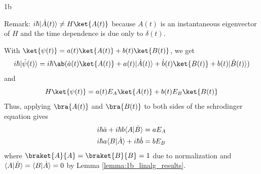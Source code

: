 \documentclass[12pt]{article}
\begin{document}
\begin{exc}{1b}
\end{exc}
\begin{ans}
Remark: $i\hbar \uket{\dot A(t)} \neq H\ket{A(t)}$ because $A(t)$ is an instantaneous eigenvector of $H$ and the time dependence is due only to $\delta(t)$.


With $\ket{\psi(t)} = a(t)\ket{A(t)} + b(t)\ket{B(t)}$, we get
\begin{equation*}
    i\hbar \uket{\dot \psi(t)} = i\hbar\ab(\dot a(t) \ket{A(t)} + a(t) \uket{\dot A(t)} + \dot b(t) \ket{B(t)} + b(t) \uket{\dot B(t)})
\end{equation*}
and 
\begin{equation*}
    H\ket{\psi(t)} = a(t)E_A\ket{A(t)} + b(t) E_B\ket{B(t)}
\end{equation*}
Thus, applying $\bra{A(t)}$ and $\bra{B(t)}$ to both sides of the schrodinger equation gives
\begin{align*}
    i\hbar \dot a  + i \hbar b \langle A \vert \dot B \rangle &= a E_A  \\
    i\hbar a \langle B \vert \dot A \rangle + i \hbar \dot b &= bE_B 
\end{align*}
where $\braket{A}{A} = \braket{B}{B} = 1$ due to normalization and $\langle A \vert \dot B \rangle = \langle B \vert \dot A \rangle = 0$ by Lemma \ref{lemma:1b_linalg_results}. 



\end{ans}
\end{document}
